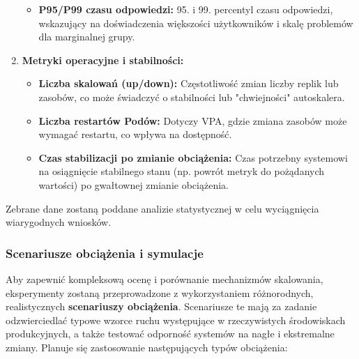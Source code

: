 \begin{enumerate}
\begin{itemize}
        \item \textbf{P95/P99 czasu odpowiedzi:} 95. i 99. percentyl czasu odpowiedzi, wskazujący na doświadczenia większości użytkowników i skalę problemów dla marginalnej grupy.
    \end{itemize}
    \item \textbf{Metryki operacyjne i stabilności:}
    \begin{itemize}
        \item \textbf{Liczba skalowań (up/down):} Częstotliwość zmian liczby replik lub zasobów, co może świadczyć o stabilności lub "chwiejności" autoskalera.
        \item \textbf{Liczba restartów Podów:} Dotyczy VPA, gdzie zmiana zasobów może wymagać restartu, co wpływa na dostępność.
        \item \textbf{Czas stabilizacji po zmianie obciążenia:} Czas potrzebny systemowi na osiągnięcie stabilnego stanu (np. powrót metryk do pożądanych wartości) po gwałtownej zmianie obciążenia.
    \end{itemize}
\end{enumerate}
Zebrane dane zostaną poddane analizie statystycznej w celu wyciągnięcia wiarygodnych wniosków.

\subsubsection{Scenariusze obciążenia i symulacje}
Aby zapewnić kompleksową ocenę i porównanie mechanizmów skalowania, eksperymenty zostaną przeprowadzone z wykorzystaniem różnorodnych, realistycznych \textbf{scenariuszy obciążenia}. Scenariusze te mają za zadanie odzwierciedlać typowe wzorce ruchu występujące w rzeczywistych środowiskach produkcyjnych, a także testować odporność systemów na nagłe i ekstremalne zmiany. Planuje się zastosowanie następujących typów obciążenia:


